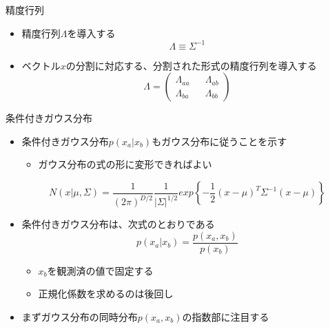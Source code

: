 \begin{frame}{精度行列}
 \begin{itemize}
  \item \alert{精度行列}$\Lambda$を導入する
        \begin{equation}
         \Lambda \equiv \Sigma^{-1}
        \end{equation}

  \item ベクトル$x$の分割に対応する、分割された形式の精度行列を導入する
        \begin{equation}
         \Lambda=
          \begin{pmatrix}
           \Lambda_{aa} && \Lambda_{ab}\\
           \Lambda_{ba} && \Lambda_{bb}
          \end{pmatrix}
        \end{equation}
 \end{itemize}
\end{frame}


\begin{frame}{条件付きガウス分布}
 \begin{itemize}
  \item 条件付きガウス分布$p(x_a|x_b)$もガウス分布に従うことを示す
	\begin{itemize}
	 \item ガウス分布の式の形に変形できればよい
	\end{itemize}
 \begin{equation}
  N(x|\mu,\Sigma) = \frac{1}{(2\pi)^{D/2}}\frac{1}{|\Sigma|^{1/2}}exp\left\{-\frac{1}{2}(x - \mu)^{T}\Sigma^{-1}(x-\mu)\right\}
 \end{equation}
  \item 条件付きガウス分布は、次式のとおりである
        \begin{equation}
         p(x_a | x_b) = \frac{p(x_a, x_b)}{p(x_b)}
        \end{equation}
        \begin{itemize}
         \item $x_b$を観測済の値で\alert{固定}する
         \item 正規化係数を求めるのは後回し
        \end{itemize}
  \item まずガウス分布の同時分布$p(x_a,x_b)$の指数部に注目する
 \end{itemize}
\end{frame}


